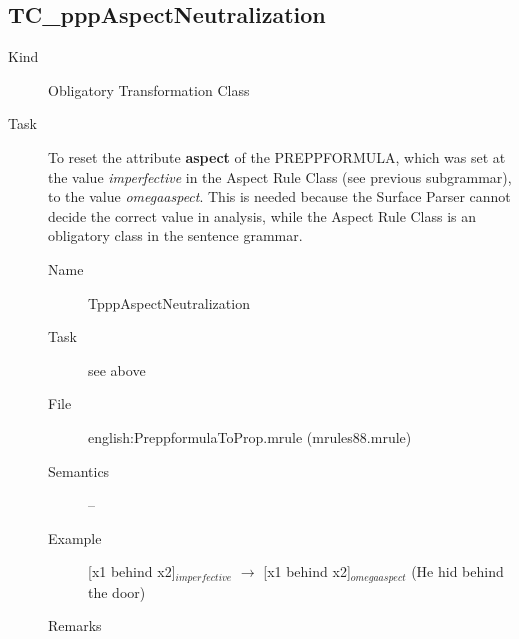 \newpage
\subsection{TC\_pppAspectNeutralization}
\begin{description}
\item[Kind] Obligatory Transformation Class
\item[Task] To reset the attribute {\bf aspect} of the PREPPFORMULA, which was  
set at the value {\em imperfective\/} in the Aspect Rule Class (see previous 
subgrammar), to the 
value {\em omegaaspect\/}. This is needed because the Surface Parser cannot 
decide the correct value in analysis, while the Aspect Rule Class is an 
obligatory class in the sentence grammar.

\vspace{1 cm}
\begin{description}
\item[Name] TpppAspectNeutralization
\item[Task] see above
\item[File] english:PreppformulaToProp.mrule (mrules88.mrule)
\item[Semantics] --
\item[Example] [x1 behind x2]$_{imperfective}$ $\rightarrow$ [x1 behind 
x2]$_{omegaaspect}$ (He hid behind the door)
\item[Remarks]
\end{description}

\end{description}

\newpage
